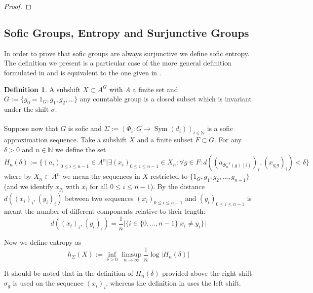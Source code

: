 \documentclass[titlepage, a4paper]{article}
\newcommand{\N}{\mathbb{N}}
\DeclareMathOperator{\sym}{Sym}
\theoremstyle{theoremdd}
\theoremstyle{definition}
\newtheorem{definition}[theorem]{Definition}
\theoremstyle{remark}
\begin{document}
\begin{proof}
\end{proof}


\subsection{Sofic Groups, Entropy and Surjunctive Groups}\label{ssec:sofic_surjunctive}

In order to prove that sofic groups are always surjunctive we define sofic entropy. The definition we present is a particular case of the more general definition formulated in \cite[paragraph 2.13.6]{capraro_lupini_2015} and is equivalent to the one given in \cite[definition 4.2]{kerr_li_2010}. 

\begin{definition}

A subshift $X \subset A^G$ with $A$ a finite set and $G := \{g_0 = 1_G, g_1, g_2, ...\}$ any countable group is a closed subset which is invariant under the shift $\sigma$.\\
\\
Suppose now that $G$ is sofic and $\Sigma := (\Phi_i: G \to \sym(d_i))_{i \in \N}$ is a sofic approximation sequence. Take a subshift $X$ and a finite subset $F \subset G$. For any $\delta > 0$ and $n \in \N$ we define the set 
		\[
		H_n (\delta) := \{(a_i)_{0 \leq i \leq n-1} \in A^n | 
						\exists (x_i)_{0 \leq i \leq n-1} \in X_n : 
						\forall g \in F: d((a_{\Phi^{-1}_n(g)(i)})_i,(x_{ g_i g})_i) < \delta \}
		\]
		where by $X_n \subset A^n$ we mean the sequences in $X$ restricted to $\{1_G, g_1, g_2, ..., g_{n-1}\}$ (and we identify $x_{g_i}$ with $x_i$ for all $0 \leq i \leq n-1$). By the distance $d((x_i)_i, (y_i)_i)$ between two sequences $(x_i)_{0 \leq i \leq n-1}$ and $(y_i)_{0 \leq i \leq n-1}$ is meant the number of different components relative to their length:
		\[
		d((x_i)_i, (y_i)_i) = \frac{1}{n} |\{i \in \{0, ..., n-1\}|x_i \neq y_i\}|
		\]
				

		Now we define entropy as 
		\[
		h_\Sigma(X) := \inf_{\delta>0} \limsup_{n \to \infty} \frac{1}{n} \log |H_n(\delta)|
		\]
\end{definition}

It should be noted that in the definition of $H_n(\delta)$ provided above the right shift $\sigma_g$ is used on the sequence $(x_i)_i$, whereas the definition in \cite[paragraph 2.13.6]{capraro_lupini_2015} uses the left shift.\\
\end{document}
